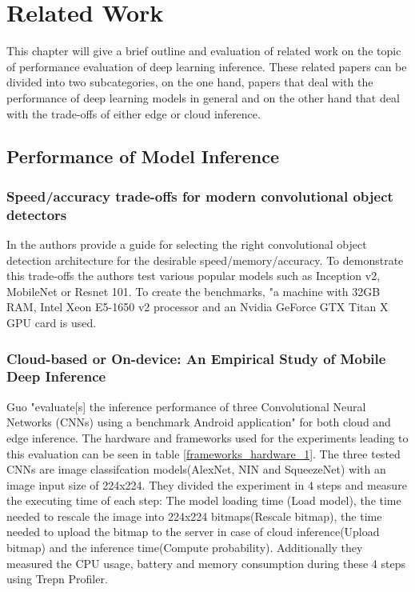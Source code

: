 \chapter{Related Work}
\label{chap:relatedWork}
This chapter will give a brief outline and evaluation of related work on the topic of performance evaluation of deep learning inference. These related papers can be divided into two subcategories, on the one hand, papers that deal with the performance of deep learning models in general and on the other hand that deal with the trade-offs of either edge or cloud inference.
\section{Performance of Model Inference}
\subsection{Speed/accuracy trade-offs for modern convolutional object detectors}
In \cite{DBLP:journals/corr/HuangRSZKFFWSG016} the authors provide a guide for selecting the right convolutional object detection architecture for the desirable speed/memory/accuracy. To demonstrate this trade-offs the authors test various popular models such as Inception v2, MobileNet or Resnet 101. To create the benchmarks, "a machine with 32GB RAM,
Intel Xeon E5-1650 v2 processor and an Nvidia GeForce
GTX Titan X GPU card \cite{DBLP:journals/corr/HuangRSZKFFWSG016} is used.


\subsection{Cloud-based or On-device:
An Empirical Study of Mobile Deep Inference}
Guo "evaluate[s] the inference performance of three Convolutional Neural Networks
(CNNs) using a benchmark Android application" \cite{DBLP:conf/ic2e/Guo18} for both cloud and edge inference. The hardware and frameworks used for the experiments leading to this evaluation can be seen in table \ref{frameworks_hardware_1}. The three tested CNNs are image classifcation models(AlexNet, NIN and SqueezeNet) with an image input size of 224x224.
They divided the experiment in 4 steps and measure the executing time of each step: 
The model loading time (Load model), the time needed to rescale the image into 224x224 bitmaps(Rescale bitmap), the time needed to upload the bitmap to the server in case of cloud inference(Upload bitmap) and the inference time(Compute probability).
Additionally they measured the CPU usage, battery and memory consumption during these 4 steps using Trepn Profiler.

